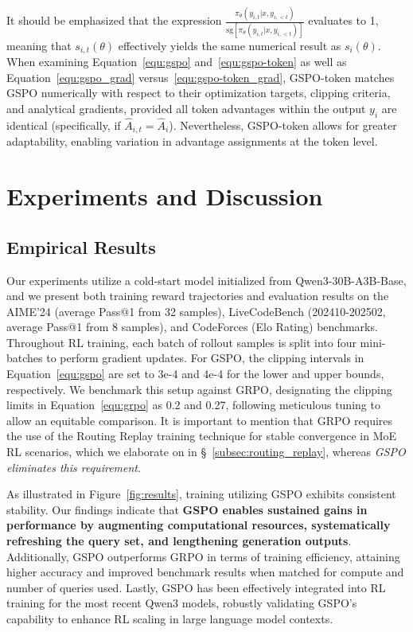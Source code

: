 It should be emphasized that the expression $\frac{ \pi_{\theta} (y_{i,t} | x, y_{i,<t}) }{ \mathrm{sg} \left[ \pi_{\theta} (y_{i,t} | x, y_{i,<t}) \right] }$ evaluates to 1, meaning that $s_{i,t}(\theta)$ effectively yields the same numerical result as $s_{i}(\theta)$. When examining Equation~\eqref{equ:gspo} and~\eqref{equ:gspo-token} as well as Equation~\eqref{equ:gspo_grad} versus~\eqref{equ:gspo-token_grad}, GSPO-token matches GSPO numerically with respect to their optimization targets, clipping criteria, and analytical gradients, provided all token advantages within the output $y_i$ are identical (specifically, if $\widehat{A}_{i,t} = \widehat{A}_{i}$). Nevertheless, GSPO-token allows for greater adaptability, enabling variation in advantage assignments at the token level.

\section{Experiments and Discussion}

\subsection{Empirical Results}

Our experiments utilize a cold-start model initialized from Qwen3-30B-A3B-Base, and we present both training reward trajectories and evaluation results on the AIME'24 (average Pass@1 from 32 samples), LiveCodeBench (202410-202502, average Pass@1 from 8 samples), and CodeForces (Elo Rating) benchmarks. Throughout RL training, each batch of rollout samples is split into four mini-batches to perform gradient updates. For GSPO, the clipping intervals in Equation~\eqref{equ:gspo} are set to 3e-4 and 4e-4 for the lower and upper bounds, respectively. We benchmark this setup against GRPO, designating the clipping limits in Equation~\eqref{equ:grpo} as 0.2 and 0.27, following meticulous tuning to allow an equitable comparison. It is important to mention that GRPO requires the use of the Routing Replay training technique for stable convergence in MoE RL scenarios, which we elaborate on in \S~\ref{subsec:routing_replay}, whereas \textit{GSPO eliminates this requirement}.

As illustrated in Figure~\ref{fig:results}, training utilizing GSPO exhibits consistent stability. Our findings indicate that \textbf{GSPO enables sustained gains in performance by augmenting computational resources, systematically refreshing the query set, and lengthening generation outputs}. Additionally, GSPO outperforms GRPO in terms of training efficiency, attaining higher accuracy and improved benchmark results when matched for compute and number of queries used. Lastly, GSPO has been effectively integrated into RL training for the most recent Qwen3 models, robustly validating GSPO’s capability to enhance RL scaling in large language model contexts.

